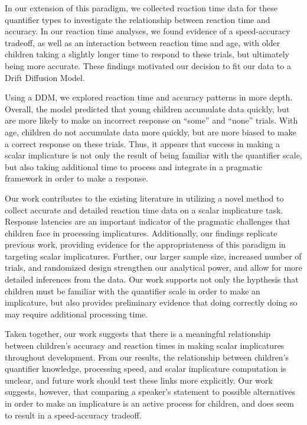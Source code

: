 \documentclass[10pt, letterpaper]{article}
\begin{document}
In our extension of this paradigm, we collected reaction time data for
these quantifier types to investigate the relationship between reaction
time and accuracy. In our reaction time analyses, we found evidence of a
speed-accuracy tradeoff, as well as an interaction between reaction time
and age, with older children taking a slightly longer time to respond to
these trials, but ultimately being more accurate. These findings
motivated our decision to fit our data to a Drift Diffusion Model.

Using a DDM, we explored reaction time and accuracy patterns in more
depth. Overall, the model predicted that young children accumulate data
quickly, but are more likely to make an incorrect response on ``some''
and ``none'' trials. With age, children do not accumulate data more
quickly, but are more biased to make a correct response on these trials.
Thus, it appears that success in making a scalar implicature is not only
the result of being familiar with the quantifier scale, but also taking
additional time to process and integrate in a pragmatic framework in
order to make a response.

Our work contributes to the existing literature in utilizing a novel
method to collect accurate and detailed reaction time data on a scalar
implicature task. Response latencies are an important indicator of the
pragmatic challenges that children face in processing implicatures.
Additionally, our findings replicate previous work, providing evidence
for the appropriateness of this paradigm in targeting scalar
implicatures. Further, our larger sample size, increased number of
trials, and randomized design strengthen our analytical power, and allow
for more detailed inferences from the data. Our work supports not only
the hypthesis that children must be familiar with the quantifier scale
in order to make an implicature, but also provides preliminary evidence
that doing correctly doing so may require additional processing time.

Taken together, our work suggests that there is a meaningful
relationship between children's accuracy and reaction times in making
scalar implicatures throughout development. From our results, the
relationship between children's quantifier knowledge, processing speed,
and scalar implicature computation is unclear, and future work should
test these links more explicitly. Our work suggests, however, that
comparing a speaker's statement to possible alternatives in order to
make an implicature is an active process for children, and does seem to
result in a speed-accuracy tradeoff.
\end{document}
